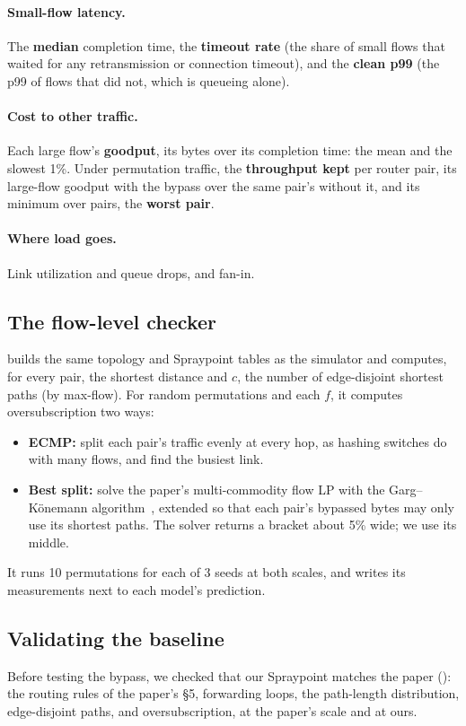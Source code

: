 \paragraph{Small-flow latency.} The \textbf{median} completion time, the \textbf{timeout rate} (the share of small flows that waited for any retransmission or connection timeout), and the \textbf{clean p99} (the p99 of flows that did not, which is queueing alone).

\paragraph{Cost to other traffic.} Each large flow's \textbf{goodput}, its bytes over its completion time: the mean and the slowest 1\%. Under permutation traffic, the \textbf{throughput kept} per router pair, its large-flow goodput with the bypass over the same pair's without it, and its minimum over pairs, the \textbf{worst pair}.

\paragraph{Where load goes.} Link utilization and queue drops, and fan-in.

\subsection{The flow-level checker}
\label{sec:checker}

 builds the same topology and Spraypoint tables as the simulator and computes, for every pair, the shortest distance and $c$, the number of edge-disjoint shortest paths (by max-flow). For random permutations and each $f$, it computes oversubscription two ways:
\begin{itemize}
  \item \textbf{ECMP:} split each pair's traffic evenly at every hop, as hashing switches do with many flows, and find the busiest link.
  \item \textbf{Best split:} solve the paper's multi-commodity flow LP with the Garg--K\"onemann algorithm~\cite{gargkonemann}, extended so that each pair's bypassed bytes may only use its shortest paths. The solver returns a bracket about 5\% wide; we use its middle.
\end{itemize}
It runs 10 permutations for each of 3 seeds at both scales, and writes its measurements next to each model's prediction.

\subsection{Validating the baseline}
\label{sec:validation}

Before testing the bypass, we checked that our Spraypoint matches the paper (): the routing rules of the paper's §5, forwarding loops, the path-length distribution, edge-disjoint paths, and oversubscription, at the paper's scale and at ours.
